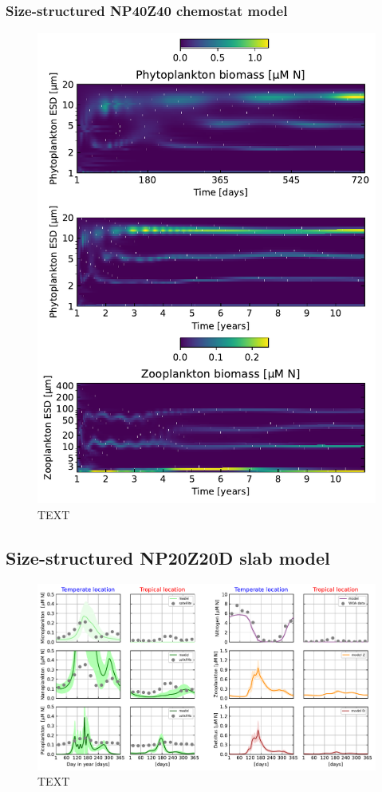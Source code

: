 \documentclass[journal abbreviation, manuscript]{copernicus}
\begin{document}
\subsubsection{Size-structured NP40Z40 chemostat model}
\begin{figure}[t]
\includegraphics[width=12cm]{Figures/firstdraft_plots/03_chemostat.pdf}
\caption{TEXT}
\label{ASTroCAT_plot}
\end{figure}

\subsection{Size-structured NP20Z20D slab model}
\begin{figure}[t]
\includegraphics[width=12cm]{Figures/firstdraft_plots/04_sizestruct_slab.pdf}
\caption{TEXT}
\label{ASTroCAT_plot}
\end{figure}
\end{document}
